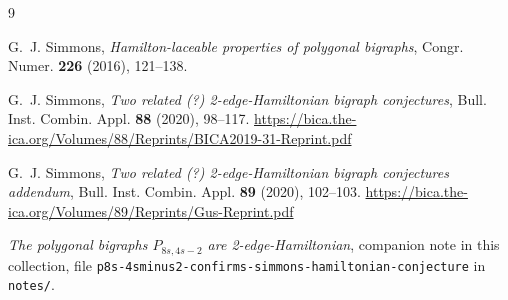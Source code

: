 \documentclass[11pt]{amsart}
\begin{document}
\begin{thebibliography}{9}

G.~J. Simmons,
\emph{Hamilton-laceable properties of polygonal bigraphs},
Congr. Numer. \textbf{226} (2016), 121--138.

G.~J. Simmons,
\emph{Two related (?) 2-edge-Hamiltonian bigraph conjectures},
Bull. Inst. Combin. Appl. \textbf{88} (2020), 98--117.
\url{https://bica.the-ica.org/Volumes/88/Reprints/BICA2019-31-Reprint.pdf}

G.~J. Simmons,
\emph{Two related (?) 2-edge-Hamiltonian bigraph conjectures addendum},
Bull. Inst. Combin. Appl. \textbf{89} (2020), 102--103.
\url{https://bica.the-ica.org/Volumes/89/Reprints/Gus-Reprint.pdf}

\emph{The polygonal bigraphs $P_{8s,4s-2}$ are 2-edge-Hamiltonian},
companion note in this collection, file
\texttt{p8s-4sminus2-\allowbreak confirms-simmons-hamiltonian-conjecture}
in \texttt{notes/}.

\end{thebibliography}
\end{document}

